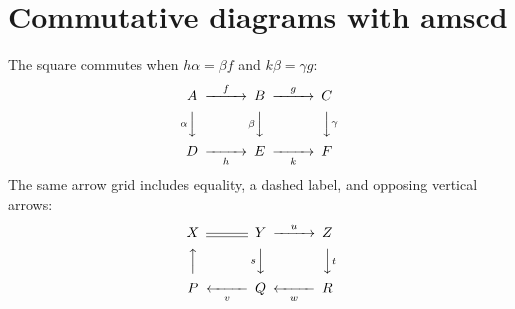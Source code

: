 \documentclass[11pt]{article}
\begin{document}
\pagestyle{empty}
\section*{Commutative diagrams with amscd}

The square commutes when $h\alpha=\beta f$ and $k\beta=\gamma g$:
\[
\begin{CD}
  A @>{f}>> B @>{g}>> C \\
  @V{\alpha}VV @V{\beta}VV @VV{\gamma}V \\
  D @>>{h}> E @>>{k}> F
\end{CD}
\]
The same arrow grid includes equality, a dashed label, and opposing vertical arrows:
\[
\begin{CD}
  X @= Y @>{u}>> Z \\
  @AAA @V{\scriptstyle s}VV @VV{\scriptstyle t}V \\
  P @<<{v}< Q @<<{w}< R
\end{CD}
\]
\end{document}
